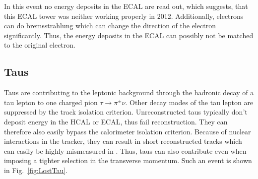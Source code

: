 In this event no energy deposits in the ECAL are read out, which suggests, that this ECAL tower was neither working properly in 2012.
Additionally, electrons can do bremsstrahlung which can change the direction of the electron significantly.
Thus, the energy deposits in the ECAL can possibly not be matched to the original electron.

\subsection*{Taus}
Taus are contributing to the leptonic background through the hadronic decay of a tau lepton to one charged pion $\tau\rightarrow\pi^{\pm}\nu$.
Other decay modes of the tau lepton are suppressed by the track isolation criterion.
Unreconstructed taus typically don't deposit energy in the HCAL or ECAL, thus fail reconstruction.
They can therefore also easily bypass the calorimeter isolation criterion.
Because of nuclear interactions in the tracker, they can result in short reconstructed tracks which can easily be highly mismeasured in \pt.
Thus, taus can also contribute even when imposing a tighter selection in the transverse momentum.
Such an event is shown in Fig.~\ref{fig:LostTau}.  


